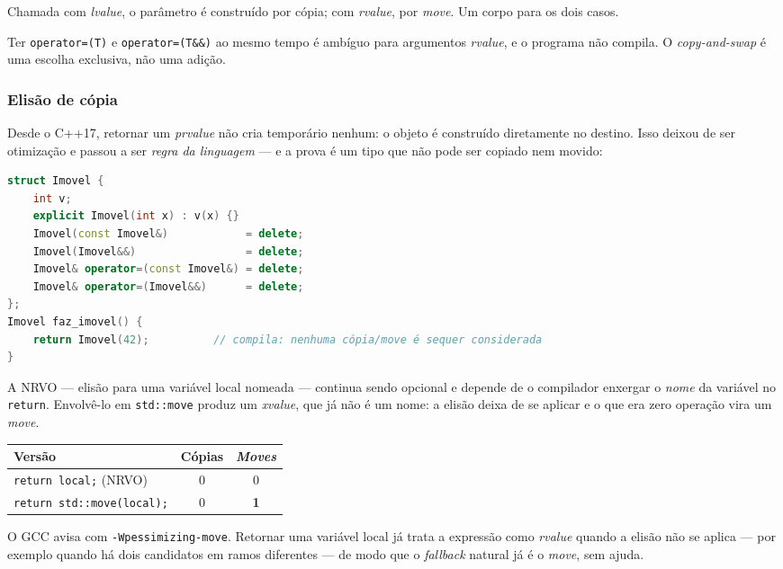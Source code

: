Chamada com \emph{lvalue}, o parâmetro é construído por cópia; com
\emph{rvalue}, por \emph{move}. Um corpo para os dois casos.

\begin{regra}
Ter \texttt{operator=(T)} e \texttt{operator=(T\&\&)} ao mesmo tempo é ambíguo
para argumentos \emph{rvalue}, e o programa não compila. O \emph{copy-and-swap}
é uma escolha exclusiva, não uma adição.
\end{regra}

\subsubsection{Elisão de cópia}

Desde o C++17, retornar um \emph{prvalue} não cria temporário nenhum: o objeto é
construído diretamente no destino. Isso deixou de ser otimização e passou a ser
\emph{regra da linguagem} --- e a prova é um tipo que não pode ser copiado nem
movido:

\begin{lstlisting}[style=bt, language=C++,
    caption={A elisão obrigatória, em
             \texttt{src/value\_semantics/demo\_copy\_elision.hpp}.}]
struct Imovel {
    int v;
    explicit Imovel(int x) : v(x) {}
    Imovel(const Imovel&)            = delete;
    Imovel(Imovel&&)                 = delete;
    Imovel& operator=(const Imovel&) = delete;
    Imovel& operator=(Imovel&&)      = delete;
};
Imovel faz_imovel() {
    return Imovel(42);          // compila: nenhuma cópia/move é sequer considerada
}
\end{lstlisting}

\begin{armadilha}
A NRVO --- elisão para uma variável local nomeada --- continua sendo opcional e
depende de o compilador enxergar o \emph{nome} da variável no \texttt{return}.
Envolvê-lo em \texttt{std::move} produz um \emph{xvalue}, que já não é um nome:
a elisão deixa de se aplicar e o que era zero operação vira um \emph{move}.
\begin{center}\footnotesize
\begin{tabular}{@{}lcc@{}}
\toprule
\textbf{Versão} & \textbf{Cópias} & \textbf{\emph{Moves}} \\
\midrule
\texttt{return local;} (NRVO)     & 0 & 0 \\
\texttt{return std::move(local);} & 0 & \textbf{1} \\
\bottomrule
\end{tabular}
\end{center}
O GCC avisa com \texttt{-Wpessimizing-move}. Retornar uma variável local já
trata a expressão como \emph{rvalue} quando a elisão não se aplica --- por
exemplo quando há dois candidatos em ramos diferentes --- de modo que o
\emph{fallback} natural já é o \emph{move}, sem ajuda.
\end{armadilha}

